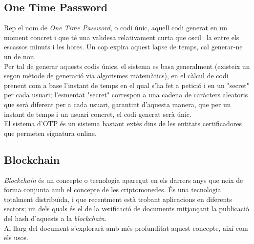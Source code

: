 \subsection{One Time Password}
Rep el nom de \textit{One Time Password}\cite{otp}, o codi únic, aquell codi generat en un moment concret i que té una validesa relativament curta que oscil·la entre els escassos minuts i les hores. Un cop expira aquest lapse de temps, cal generar-ne un de nou.\\
\newline Per tal de generar aquests codis únics, el sistema es basa generalment  (existeix un segon mètode de generació via algorismes matemàtics), en el càlcul de codi prenent com a base l'instant de temps en el qual s'ha fet a petició i en un "secret" per cada usuari; l'esmentat "secret" correspon a una cadena de caràcters aleatoris que serà diferent per a cada usuari, garantint d'aquesta manera, que per un instant de temps i un usuari concret, el codi generat serà únic.\\
\newline El sistema d'OTP és un sistema bastant extès dins de les entitats certificadores que permeten signatura online.

\subsection{Blockchain}
\textit{Blockchain}\cite{blockchain} és un concepte o tecnologia aparegut en els darrers anys que neix de forma conjunta amb el concepte de les criptomonedes.
És una tecnologia totalment distribuïda, i que recentment està trobant aplicacions en diferents sectors; un dels quals és el de la verificació de documents mitjançant la publicació del hash d'aquests a la \textit{blockchain}\cite{blockchain}.\\
\newline Al llarg del document s'explorarà amb més profunditat aquest concepte, així com els usos.